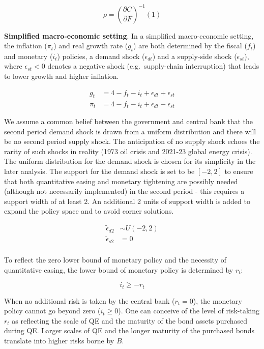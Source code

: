 \documentclass[
  a4paper,
  abstract=true]{scrartcl}
\theoremstyle{definition}
\begin{document}
\[
\rho=\left( \frac{\partial C}{\partial F} \right)^{-1}(1)
\]

\textbf{Simplified macro-economic setting}. In a simplified
macro-economic setting, the inflation (\(\pi_t\)) and real growth rate
(\(g_t\)) are both determined by the fiscal (\(f_t\)) and monetary
(\(i_t\)) policies, a demand shock (\(\epsilon_{dt}\)) and a supply-side
shock (\(\epsilon_{st}\)), where \(\epsilon_{st}<0\) denotes a negative
shock (e.g.~supply-chain interruption) that leads to lower growth and
higher inflation.

\begin{align*} g_t &= 4-f_t-i_t+\epsilon_{dt}+\epsilon_{st}\\ \pi_t &= 4-f_t-i_t+\epsilon_{dt}-\epsilon_{st} \end{align*}

We assume a common belief between the government and central bank that
the second period demand shock is drawn from a uniform distribution and
there will be no second period supply shock. The anticipation of no
supply shock echoes the rarity of such shocks in reality (1973 oil
crisis and 2021-23 global energy crisis). The uniform distribution for
the demand shock is chosen for its simplicity in the later analysis. The
support for the demand shock is set to be \([-2,2]\) to ensure that both
quantitative easing and monetary tightening are possibly needed
(although not necessarily implemented) in the second period - this
requires a support width of at least 2. An additional 2 units of support
width is added to expand the policy space and to avoid corner solutions.

\begin{align*}
\tilde\epsilon_{d2} &\sim U(-2, 2) \\
\tilde\epsilon_{s2}&=0 \\
\end{align*}

To reflect the zero lower bound of monetary policy and the necessity of
quantitative easing, the lower bound of monetary policy is determined by
\(r_t\):

\[
i_t\geq-r_t
\]

When no additional risk is taken by the central bank (\(r_t=0\)), the
monetary policy cannot go beyond zero (\(i_t\geq0\)). One can conceive
of the level of risk-taking \(r_t\) as reflecting the scale of QE and
the maturity of the bond assets purchased during QE. Larger scales of QE
and the longer maturity of the purchased bonds translate into higher
risks borne by \(B\).
\end{document}
